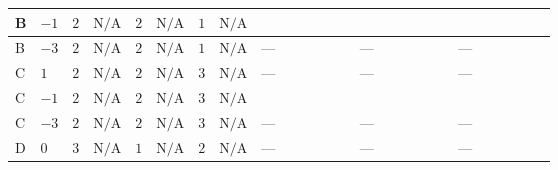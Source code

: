 \documentclass[8pt]{article}
\begin{document}
\begin{landscape}
\begin{longtable}{@{}llcccccc >{\raggedright\arraybackslash}p{0.21\linewidth} >{\raggedright\arraybackslash}p{0.21\linewidth} >{\raggedright\arraybackslash}p{0.21\linewidth}@{}}
B & $-1$ & $2$ & $\text{N/A}$ & $2$ & $\text{N/A}$ & $1$ & $\text{N/A}$ & \scriptsize\adjustbox{max width=\linewidth}{$\begin{gathered} {\lambda_{X_{17}}^{(1)}} (6 \operatorname{Tr}\!\left({Y_d}\,\left({Y_d}\right)^{\dagger}\right)+2 \operatorname{Tr}\!\left({Y_e}\,\left({Y_e}\right)^{\dagger}\right)+6 \operatorname{Tr}\!\left({Y_u}\,\left({Y_u}\right)^{\dagger}\right))\end{gathered}$} & \scriptsize\adjustbox{max width=\linewidth}{$\begin{gathered} +{\lambda_{9}} (8 \left({\lambda_{X_{17}}^{(1)}}\right)^{*}-4 \left({\lambda_{H H^\dagger S_1^\dagger S_2^\dagger}^{\rm Cross}}\right)^{*})\end{gathered}$} & \scriptsize\adjustbox{max width=\linewidth}{$\begin{gathered} -9 {g_2}^2 {\lambda_{X_{17}}^{(1)}}\end{gathered}$} \\
\midrule
B & $-3$ & $2$ & $\text{N/A}$ & $2$ & $\text{N/A}$ & $1$ & $\text{N/A}$ & --- & --- & --- \\
\midrule
C & $1$ & $2$ & $\text{N/A}$ & $2$ & $\text{N/A}$ & $3$ & $\text{N/A}$ & --- & --- & --- \\
\midrule
C & $-1$ & $2$ & $\text{N/A}$ & $2$ & $\text{N/A}$ & $3$ & $\text{N/A}$ & \scriptsize\adjustbox{max width=\linewidth}{$\begin{gathered} {\lambda_{X_{17}}^{(1)}} (6 \operatorname{Tr}\!\left({Y_d}\,\left({Y_d}\right)^{\dagger}\right)+2 \operatorname{Tr}\!\left({Y_e}\,\left({Y_e}\right)^{\dagger}\right)+6 \operatorname{Tr}\!\left({Y_u}\,\left({Y_u}\right)^{\dagger}\right))\end{gathered}$} & \scriptsize\adjustbox{max width=\linewidth}{$\begin{gathered} +{\lambda_{9}} (8 \left({\lambda_{X_{17}}^{(1)}}\right)^{*}-4 \left({\lambda_{H H^\dagger S_1^\dagger S_2^\dagger}^{\rm Cross}}\right)^{*})\end{gathered}$} & \scriptsize\adjustbox{max width=\linewidth}{$\begin{gathered} -9 {g_2}^2 {\lambda_{X_{17}}^{(1)}}\end{gathered}$} \\
\midrule
C & $-3$ & $2$ & $\text{N/A}$ & $2$ & $\text{N/A}$ & $3$ & $\text{N/A}$ & --- & --- & --- \\
\midrule
D & $0$ & $3$ & $\text{N/A}$ & $1$ & $\text{N/A}$ & $2$ & $\text{N/A}$ & --- & --- & --- \\
\midrule

\end{longtable}
\end{landscape}
\end{document}
